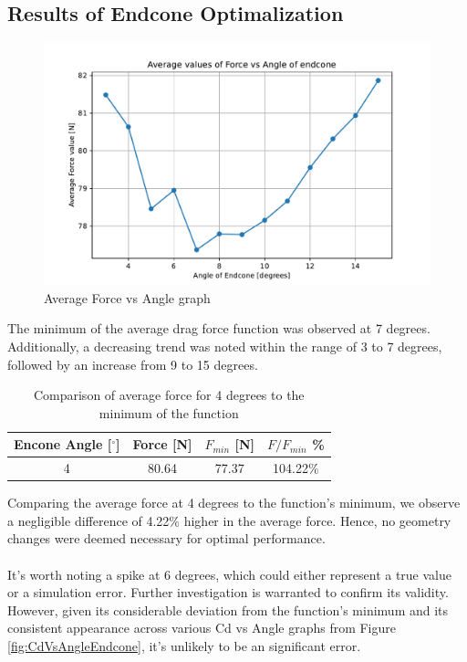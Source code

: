 \documentclass{article}
\newcommand{\degree}{\ensuremath{^\circ}}
\begin{document}
\subsection{Results of Endcone Optimalization}
\begin{figure}[H]
    \centering
    \includegraphics[width=\textwidth]{../data/R6-Parametric-Endcone/ForceVsAngle.pdf}
    \caption{Average Force vs Angle graph}
\end{figure}
The minimum of the average drag force function was observed at 7 degrees. Additionally, a 
decreasing trend was noted within the range of 3 to 7 degrees, followed by an increase 
from 9 to 15 degrees.
\begin{table}[h]
    \centering
    \begin{tabular}{|c|c|c|c|}
    \hline
    Encone Angle [$\degree$]& Force [N]& $F_{min}$ [N] & $F/F_{min}$ \%\\
    \hline
    4 & 80.64 & 77.37 & 104.22\% \\
    \hline
    \end{tabular}
    \caption{Comparison of average force for 4 degrees to the minimum of the function}
    \label{tab:ChangeInForce}
\end{table}

\noindent Comparing the average force at 4 degrees to the function's minimum, we observe a 
negligible difference of 4.22\% higher in the average force. Hence, no geometry changes were 
deemed necessary for optimal performance.\\\\
It's worth noting a spike at 6 degrees, which could either represent a true value or a 
simulation error. Further investigation is warranted to confirm its validity. However, given 
its considerable deviation from the function's minimum and its consistent appearance across 
various Cd vs Angle graphs from Figure \ref{fig:CdVsAngleEndcone}, it's unlikely to 
be an significant error.
\end{document}
